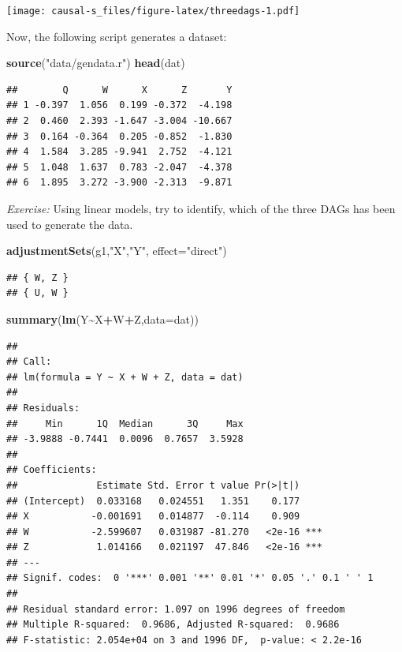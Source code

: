 \documentclass[
]{book}
\newenvironment{Shaded}{\begin{snugshade}}{\end{snugshade}}
\newcommand{\AttributeTok}[1]{\textcolor[rgb]{0.13,0.29,0.53}{#1}}
\newcommand{\FunctionTok}[1]{\textcolor[rgb]{0.13,0.29,0.53}{\textbf{#1}}}
\newcommand{\NormalTok}[1]{#1}
\newcommand{\SpecialCharTok}[1]{\textcolor[rgb]{0.81,0.36,0.00}{\textbf{#1}}}
\newcommand{\StringTok}[1]{\textcolor[rgb]{0.31,0.60,0.02}{#1}}
\begin{document}
\texttt{[image: causal-s\_files/figure-latex/threedags-1.pdf]}

Now, the following script generates a dataset:

\begin{Shaded}
\begin{Highlighting}[]
\FunctionTok{source}\NormalTok{(}\StringTok{"data/gendata.r"}\NormalTok{)}
\FunctionTok{head}\NormalTok{(dat)}
\end{Highlighting}
\end{Shaded}

\begin{verbatim}
##        Q      W      X      Z       Y
## 1 -0.397  1.056  0.199 -0.372  -4.198
## 2  0.460  2.393 -1.647 -3.004 -10.667
## 3  0.164 -0.364  0.205 -0.852  -1.830
## 4  1.584  3.285 -9.941  2.752  -4.121
## 5  1.048  1.637  0.783 -2.047  -4.378
## 6  1.895  3.272 -3.900 -2.313  -9.871
\end{verbatim}

\emph{Exercise:} Using linear models, try to identify, which of the three DAGs has been used to generate the data.

\begin{Shaded}
\begin{Highlighting}[]
\FunctionTok{adjustmentSets}\NormalTok{(g1,}\StringTok{"X"}\NormalTok{,}\StringTok{"Y"}\NormalTok{, }\AttributeTok{effect=}\StringTok{"direct"}\NormalTok{)}
\end{Highlighting}
\end{Shaded}

\begin{verbatim}
## { W, Z }
## { U, W }
\end{verbatim}

\begin{Shaded}
\begin{Highlighting}[]
\FunctionTok{summary}\NormalTok{(}\FunctionTok{lm}\NormalTok{(Y}\SpecialCharTok{\textasciitilde{}}\NormalTok{X}\SpecialCharTok{+}\NormalTok{W}\SpecialCharTok{+}\NormalTok{Z,}\AttributeTok{data=}\NormalTok{dat))}
\end{Highlighting}
\end{Shaded}

\begin{verbatim}
## 
## Call:
## lm(formula = Y ~ X + W + Z, data = dat)
## 
## Residuals:
##     Min      1Q  Median      3Q     Max 
## -3.9888 -0.7441  0.0096  0.7657  3.5928 
## 
## Coefficients:
##              Estimate Std. Error t value Pr(>|t|)    
## (Intercept)  0.033168   0.024551   1.351    0.177    
## X           -0.001691   0.014877  -0.114    0.909    
## W           -2.599607   0.031987 -81.270   <2e-16 ***
## Z            1.014166   0.021197  47.846   <2e-16 ***
## ---
## Signif. codes:  0 '***' 0.001 '**' 0.01 '*' 0.05 '.' 0.1 ' ' 1
## 
## Residual standard error: 1.097 on 1996 degrees of freedom
## Multiple R-squared:  0.9686, Adjusted R-squared:  0.9686 
## F-statistic: 2.054e+04 on 3 and 1996 DF,  p-value: < 2.2e-16
\end{verbatim}
\end{document}
